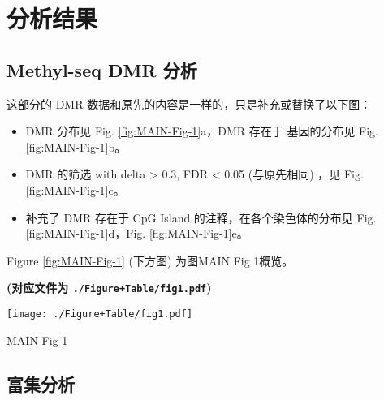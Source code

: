 \documentclass[
]{article}
\providecommand{\tightlist}{%
  \setlength{\itemsep}{0pt}\setlength{\parskip}{0pt}}
\begin{document}
\hypertarget{results}{%
\section{分析结果}\label{results}}

\hypertarget{methyl-seq-dmr-ux5206ux6790}{%
\subsection{Methyl-seq DMR 分析}\label{methyl-seq-dmr-ux5206ux6790}}

这部分的 DMR 数据和原先的内容是一样的，只是补充或替换了以下图：

\begin{itemize}
\tightlist
\item
  DMR 分布见 Fig. \ref{fig:MAIN-Fig-1}a，DMR 存在于 基因的分布见 Fig. \ref{fig:MAIN-Fig-1}b。
\item
  DMR 的筛选 with \textbar delta\textbar{} \textgreater{} 0.3, FDR \textless{} 0.05 (与原先相同) ，见 Fig. \ref{fig:MAIN-Fig-1}c。
\item
  补充了 DMR 存在于 CpG Island 的注释，在各个染色体的分布见 Fig. \ref{fig:MAIN-Fig-1}d，Fig. \ref{fig:MAIN-Fig-1}e。
\end{itemize}

\begin{center}\vspace{1.5cm}\end{center}

Figure \ref{fig:MAIN-Fig-1} (下方图) 为图MAIN Fig 1概览。

\textbf{(对应文件为 \texttt{./Figure+Table/fig1.pdf})}

\def\@captype{figure}
\begin{center}
\texttt{[image: ./Figure+Table/fig1.pdf]}
\caption{MAIN Fig 1}\label{fig:MAIN-Fig-1}
\end{center}

\begin{center}\vspace{1.5cm}\end{center}

\hypertarget{ux5bccux96c6ux5206ux6790}{%
\subsection{富集分析}\label{ux5bccux96c6ux5206ux6790}}
\end{document}
